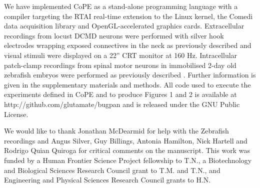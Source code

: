 \begin{materials}
  We have implemented CoPE as a stand-alone programming language with
  a compiler targeting the RTAI real-time extension to the Linux
  kernel, the Comedi data acquisition library and OpenGL-accelerated
  graphics cards. Extracellular recordings from locust DCMD neurons
  were performed with silver hook electrodes wrapping exposed
  connectives in the neck as previously described \cite{Matheson2004}
  and visual stimuli were displayed on a 22'' CRT monitor at 160
  Hz. Intracellular patch-clamp recordings from spinal motor neurons
  in immobilised 2-day old zebrafish embryos were performed as
  previously described \cite{McDearmid2006}. Further information is
  given in the supplementary materials and methods. All code used to
  execute the experiments defined in CoPE and to produce Figures 1 and
  2 is available at http://github.com/glutamate/bugpan and is released
  under the GNU Public License.

\begin{comment}
\subsubsection{Author Contributions}  
T.N. designed and implemented CoPE, carried out the experiments and
data analyses, and wrote the draft of the paper. H.N. contributed to
the language design, helped clarify the semantics, and wrote several
sections of the manuscript. T.M. contributed to the design of the
experiments and the data analysis, and made extensive comments on
drafts of the manuscript. All authors obtained grant funding to
support this project as described in the acknowledgements.
\end{comment}
\end{materials}

\begin{acknowledgments} 

We would like to thank Jonathan McDearmid for help with the Zebrafish
recordings and Angus Silver, Guy Billings, Antonia Hamilton, Nick
Hartell and Rodrigo Quian Quiroga for critical comments on the
manuscript. This work was funded by a Human Frontier Science Project
fellowship to T.N., a Biotechnology and Biological Sciences Research
Council grant to T.M. and T.N., and Engineering and Physical Sciences Research
Council grants to H.N.
\end{acknowledgments}


